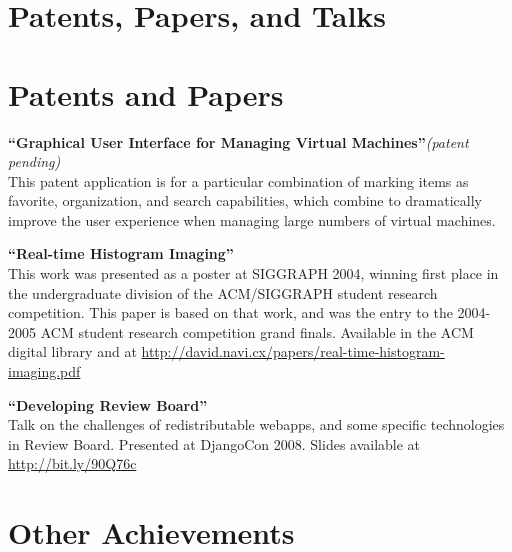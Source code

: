 \documentclass[margin,line]{resume}
\begin{document}
\begin{resume}
    \ifcv
        \section{\mysidestyle Patents, Papers, and Talks}
    \else
        \section{\mysidestyle Patents and Papers}
    \fi

    {\bf``Graphical User Interface for Managing Virtual Machines''}{\it (patent pending)} \vspace{2mm}\\\vspace{1mm}%
    This patent application is for a particular combination of marking
    items as favorite, organization, and search capabilities, which combine
    to dramatically improve the user experience when managing large numbers
    of virtual machines.

    {\bf``Real-time Histogram Imaging''} \vspace{2mm}\\\vspace{1mm}%
    This work was presented as a poster at SIGGRAPH 2004, winning first place in
    the undergraduate division of the ACM/SIGGRAPH student research competition.
    This paper is based on that work, and was the entry to the 2004-2005 ACM
    student research competition grand finals. Available in the ACM digital
    library and at
    \url{http://david.navi.cx/papers/real-time-histogram-imaging.pdf}

    \ifcv
        {\bf``Developing Review Board''} \vspace{2mm}\\\vspace{1mm}%
        Talk on the challenges of redistributable webapps, and some specific
        technologies in Review Board. Presented at DjangoCon 2008. Slides
        available at \url{http://bit.ly/90Q76c}
    \fi

    \ifcv
        \newpage
    \fi

    \section{\mysidestyle Other Achievements}


\end{resume}
\end{document}

